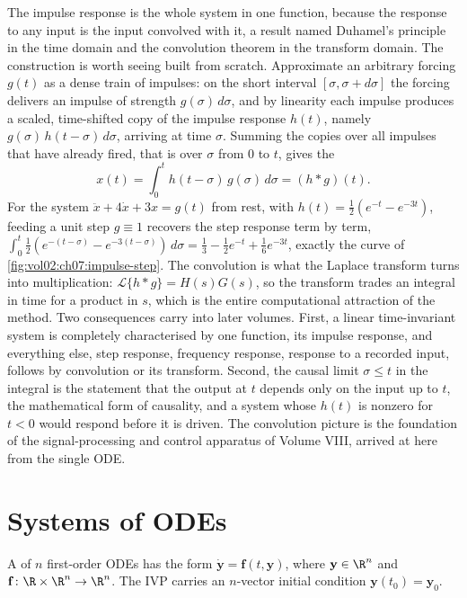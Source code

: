 \begin{mastery}
The impulse response is the whole system in one function, because the
response to any input is the input convolved with it, a result named
Duhamel's principle in the time domain and the convolution theorem in
the transform domain. The construction is worth seeing built from
scratch. Approximate an arbitrary forcing $g(t)$ as a dense train of
impulses: on the short interval $[\sigma, \sigma + d\sigma]$ the forcing
delivers an impulse of strength $g(\sigma)\,d\sigma$, and by linearity
each impulse produces a scaled, time-shifted copy of the impulse
response $h(t)$, namely $g(\sigma)\,h(t - \sigma)\,d\sigma$, arriving at
time $\sigma$. Summing the copies over all impulses that have already
fired, that is over $\sigma$ from $0$ to $t$, gives the
\[
x(t) = \int_{0}^{t} h(t - \sigma)\, g(\sigma)\, d\sigma
= (h \ast g)(t).
\]
For the system $\ddot{x} + 4\dot{x} + 3x = g(t)$ from rest, with $h(t) =
\tfrac12(e^{-t} - e^{-3t})$, feeding a unit step $g \equiv 1$ recovers
the step response term by term, $\int_{0}^{t}\tfrac12(e^{-(t-\sigma)} -
e^{-3(t-\sigma)})\,d\sigma = \tfrac13 - \tfrac12 e^{-t} + \tfrac16
e^{-3t}$, exactly the curve of \cref{fig:vol02:ch07:impulse-step}. The
convolution is what the Laplace transform turns into multiplication:
$\mathcal{L}\{h \ast g\} = H(s)G(s)$, so the transform trades an integral
in time for a product in $s$, which is the entire computational
attraction of the method. Two consequences carry into later volumes.
First, a linear time-invariant system is completely characterised by one
function, its impulse response, and everything else, step response,
frequency response, response to a recorded input, follows by convolution
or its transform. Second, the causal limit $\sigma \leq t$ in the
integral is the statement that the output at $t$ depends only on the
input up to $t$, the mathematical form of causality, and a system whose
$h(t)$ is nonzero for $t < 0$ would respond before it is driven. The
convolution picture is the foundation of the signal-processing and
control apparatus of Volume VIII, arrived at here from the single ODE.
\end{mastery}

\section{Systems of ODEs}

A  of $n$ first-order ODEs has the form $\dot{\mathbf{y}}
= \mathbf{f}(t, \mathbf{y})$, where $\mathbf{y} \in \R^{n}$ and
$\mathbf{f} \colon \R \times \R^{n} \to \R^{n}$. The IVP carries an
$n$-vector initial condition $\mathbf{y}(t_{0}) = \mathbf{y}_{0}$.

